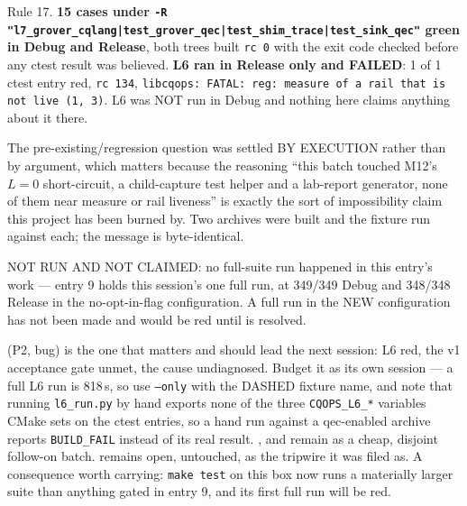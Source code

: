 Rule 17. \textbf{15 cases under \texttt{-R "l7\_grover\_cqlang|test\_grover\_qec|test\_shim\_trace|test\_sink\_qec"} green in Debug and Release}, both trees built \texttt{rc 0} with the exit code checked before any ctest result was believed.
\textbf{L6 ran in Release only and FAILED}: 1 of 1 ctest entry red, \texttt{rc 134},
\texttt{libcqops: FATAL: reg: measure of a rail that is not live (1, 3)}. L6 was NOT run in
Debug and nothing here claims anything about it there.

The pre-existing/regression question was settled BY EXECUTION rather than by argument, which
matters because the reasoning ``this batch touched M12's $L=0$ short-circuit, a child-capture
test helper and a lab-report generator, none of them near measure or rail liveness'' is
exactly the sort of impossibility claim this project has been burned by. Two archives were
built and the fixture run against each; the message is byte-identical.

NOT RUN AND NOT CLAIMED: no full-suite run happened in this entry's work --- entry 9 holds
this session's one full run, at 349/349 Debug and 348/348 Release in the
no-opt-in-flag configuration. A full run in the NEW configuration has not been made and
would be red until  is resolved.

 (P2, bug) is the one that matters and should lead the next session: L6 red, the
v1 acceptance gate unmet, the cause undiagnosed. Budget it as its own session --- a full L6
run is 818\,s, so use \texttt{--only} with the DASHED fixture name, and note that running
\texttt{l6\_run.py} by hand exports none of the three \texttt{CQOPS\_L6\_*} variables CMake
sets on the ctest entries, so a hand run against a qec-enabled archive reports
\texttt{BUILD\_FAIL} instead of its real result.
,  and  remain as a cheap, disjoint follow-on batch.
 remains open, untouched, as the tripwire it was filed as.
A consequence worth carrying: \texttt{make test} on this box now runs a materially larger
suite than anything gated in entry 9, and its first full run will be red.
